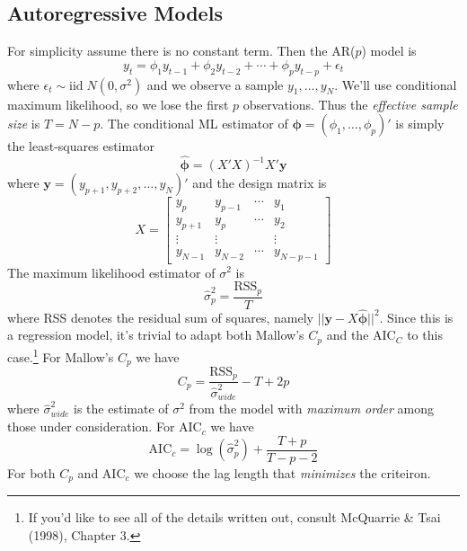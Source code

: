 \subsection{Autoregressive Models}
For simplicity assume there is no constant term. Then the AR($p$) model is
	$$y_t = \phi_1 y_{t-1} + \phi_2 y_{t-2} + \cdots + \phi_p y_{t-p} + \epsilon_t$$
where $\epsilon_t \sim \mbox{iid} \; N(0,\sigma^2)$ and we observe a sample $y_1, \hdots, y_N$. We'll use conditional maximum likelihood, so we lose the first $p$ observations. Thus the \emph{effective sample size} is $T = N-p$. The conditional ML estimator of $\boldsymbol{\phi} = \left(\phi_1, \hdots, \phi_p \right)'$ is simply the least-squares estimator
	$$\widehat{\boldsymbol{\phi}} = (X'X)^{-1}X'\textbf{y}$$
where $\mathbf{y} = (y_{p+1}, y_{p+2}, \hdots, y_N)'$ and the design matrix is
	$$X = \left[ \begin{array}
		{cccc}
		y_p & y_{p-1} & \cdots & y_1\\
		y_{p+1} & y_{p} & \cdots  & y_2\\
		\vdots &  \vdots & &\vdots\\
		y_{N-1} & y_{N-2} &\cdots & y_{N-p-1}
	\end{array}\right]$$
The maximum likelihood estimator of $\sigma^2$ is
	$$\widehat{\sigma}^2_p = \frac{\mbox{RSS}_p}{T}$$
where RSS denotes the residual sum of squares, namely $\lvert\lvert\mathbf{y} - X\widehat{\boldsymbol{\phi}} \rvert\rvert^2$. Since this is a regression model, it's trivial to adapt both Mallow's $C_p$ and the AIC$_C$ to this case.\footnote{If you'd like to see all of the details written out, consult McQuarrie \& Tsai (1998), Chapter 3.} For Mallow's $C_p$ we have
	$$C_p = \frac{\mbox{RSS}_p}{\widehat{\sigma}^2_{wide}} - T + 2p$$
where $\widehat{\sigma}^2_{wide}$ is the estimate of $\sigma^2$ from the model with \emph{maximum order} among those under consideration. For AIC$_c$ we have
	$$\mbox{AIC}_c = \log\left(\widehat{\sigma}^2_p \right) + \frac{T+p}{T-p-2} $$
For both $C_p$ and AIC$_c$ we choose the lag length that \emph{minimizes} the criteiron. 

